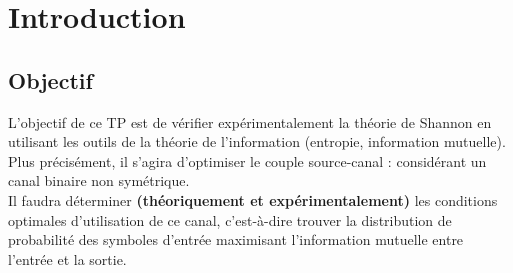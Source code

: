 \documentclass{report}
\begin{document}
\chapter{Introduction}
\section{Objectif}

L’objectif de ce TP est de vérifier expérimentalement la théorie de Shannon en utilisant les
outils de la théorie de l’information (entropie, information mutuelle). Plus précisément, il
s’agira d’optimiser le couple source-canal : considérant un canal binaire non symétrique.\\ Il
faudra déterminer \textbf{(théoriquement et expérimentalement) }les conditions optimales d’utilisation
de ce canal, c’est-à-dire trouver la distribution de probabilité des symboles d’entrée maximisant
l’information mutuelle entre l’entrée et la sortie.
\end{document}
